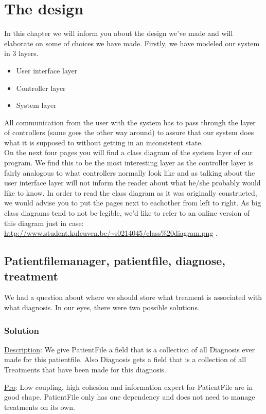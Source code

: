 \documentclass[11pt]{article}
\begin{document}
\section{The design}
In this chapter we will inform you about the design we've made and will elaborate on some of choices we have made. Firstly, we have modeled our system in 3 layers. 
\begin{itemize}
\item{User interface layer}
\item{Controller layer}
\item{System layer}
\end{itemize}
All communication from the user with the system has to pass through the layer of controllers (same goes the other way around) to assure that our system does what it is supposed to without getting in an inconsistent state.
\\On the next four pages you will find a class diagram of the system layer of our program. We find this to be the most interesting layer as the controller layer is fairly analogous to what controllers normally look like and as talking about the user interface layer will not inform the reader about what he/she probably would like to know. In order to read the class diagram as it was originally constructed, we would advise you to put the pages next to eachother from left to right. As big class diagrams tend to not be legible, we'd like to refer to an online version of this diagram just in case: \url{http://www.student.kuleuven.be/~s0214045/class%20diagram.png} .\\

\subsection{Patientfilemanager, patientfile, diagnose, treatment}
We had a question about where we should store what treament is associated with what diagnosis. In our eyes, there were two possible solutions.
\subsubsection{Solution}
\underline{Description}: We give PatientFile a field that is a collection of all Diagnosis ever made for this patientfile. Also Diagnosis gets a field that is a collection of all Treatments that have been made for this diagnosis.

\underline{Pro}: Low coupling, high cohesion and information expert for PatientFile are in good shape. PatientFile only has one dependency and does not need to manage treatments on its own.
\end{document}
